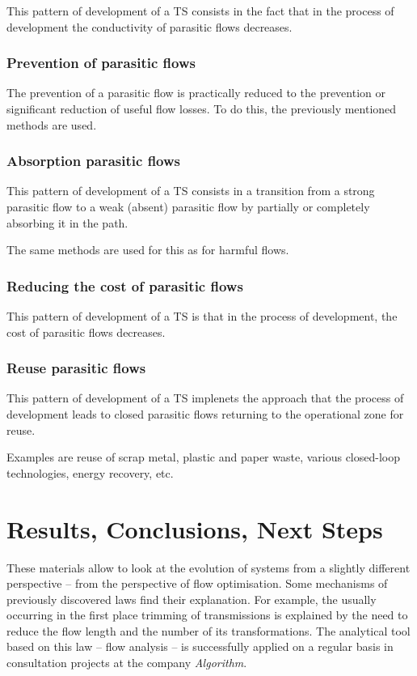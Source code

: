 \documentclass[a4paper,11pt]{article}
\begin{document}
This pattern of development of a TS consists in the fact that in the process
of development the conductivity of parasitic flows decreases.

\subsubsection{Prevention of parasitic flows}

The prevention of a parasitic flow is practically reduced to the prevention or
significant reduction of useful flow losses. To do this, the previously
mentioned methods are used.

\subsubsection{Absorption parasitic flows}

This pattern of development of a TS consists in a transition from a strong
parasitic flow to a weak (absent) parasitic flow by partially or completely
absorbing it in the path.

The same methods are used for this as for harmful flows.

\subsubsection{Reducing the cost of parasitic flows}

This pattern of development of a TS is that in the process of development, the
cost of parasitic flows decreases.

\subsubsection{Reuse parasitic flows}

This pattern of development of a TS implenets the approach that the process of
development leads to closed parasitic flows returning to the operational zone
for reuse.

Examples are reuse of scrap metal, plastic and paper waste, various
closed-loop technologies, energy recovery, etc.

\section*{Results, Conclusions, Next Steps}

These materials allow to look at the evolution of systems from a slightly
different perspective -- from the perspective of flow optimisation. Some
mechanisms of previously discovered laws find their explanation. For example,
the usually occurring in the first place trimming of transmissions is
explained by the need to reduce the flow length and the number of its
transformations. The analytical tool based on this law -- flow analysis -- is
successfully applied on a regular basis in consultation projects at the
company \emph{Algorithm}.
\end{document}
